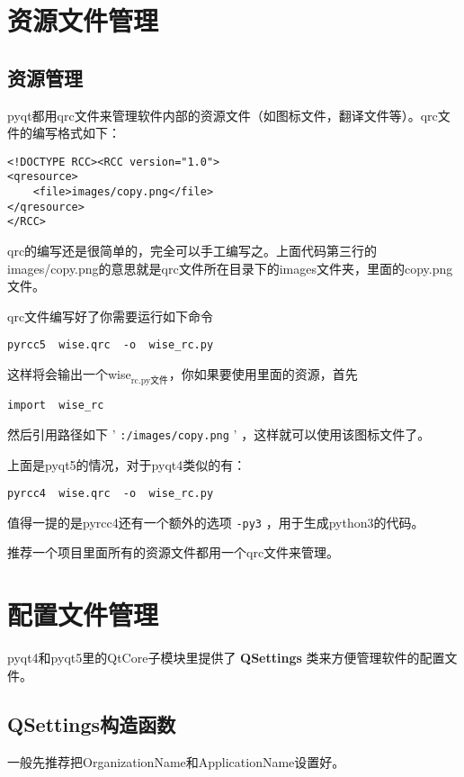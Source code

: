 \documentclass[11pt,oneside]{article}
\begin{document}
\section{资源文件管理}
\label{sec:orgheadline25}
\subsection{资源管理}
\label{sec:orgheadline24}
pyqt都用qrc文件来管理软件内部的资源文件（如图标文件，翻译文件等）。qrc文件的编写格式如下：
\begin{verbatim}
<!DOCTYPE RCC><RCC version="1.0">
<qresource>
    <file>images/copy.png</file>
</qresource>
</RCC>
\end{verbatim}

qrc的编写还是很简单的，完全可以手工编写之。上面代码第三行的images/copy.png的意思就是qrc文件所在目录下的images文件夹，里面的copy.png文件。

qrc文件编写好了你需要运行如下命令
\begin{verbatim}
pyrcc5  wise.qrc  -o  wise_rc.py
\end{verbatim}

这样将会输出一个wise\(_{\text{rc.py文件}}\)，你如果要使用里面的资源，首先
\begin{verbatim}
import  wise_rc
\end{verbatim}

然后引用路径如下 ' \texttt{:/images/copy.png} ' ，这样就可以使用该图标文件了。

上面是pyqt5的情况，对于pyqt4类似的有：
\begin{verbatim}
pyrcc4  wise.qrc  -o  wise_rc.py
\end{verbatim}

值得一提的是pyrcc4还有一个额外的选项 \texttt{-py3} ，用于生成python3的代码。

推荐一个项目里面所有的资源文件都用一个qrc文件来管理。



\section{配置文件管理}
\label{sec:orgheadline32}
pyqt4和pyqt5里的QtCore子模块里提供了 \textbf{QSettings} 类来方便管理软件的配置文件。

\subsection{QSettings构造函数}
\label{sec:orgheadline26}
一般先推荐把OrganizationName和ApplicationName设置好。
\end{document}
